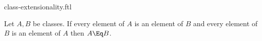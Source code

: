 \documentclass{stex}
\begin{document}
\begin{smodule}{class-extensionality.ftl}


\begin{fakeforthel}
  \begin{axiom*}
    Let $A,B$ be classes.
    If every element of $A$ is an element of $B$ and every element of $B$ is an element of $A$ then $A \Eq B$.
  \end{axiom*}
\end{fakeforthel}

\end{smodule}
\end{document}
